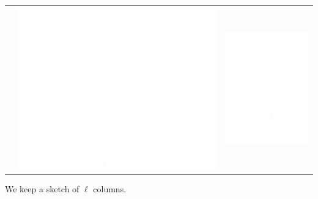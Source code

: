 \documentclass{beamer}
\begin{document}
\begin{frame}
\begin{center}
\begin{tabular}{ccc}
			& \includegraphics*[scale=0.23]{figures/FD5_white.png}  
			 & \includegraphics*[scale=0.23]{figures/FD3_white.png} 
			\\
		\end{tabular} 
	\end{center}
	
	We keep a sketch of $\ell$ columns. 
	
\end{frame}
\end{document}

